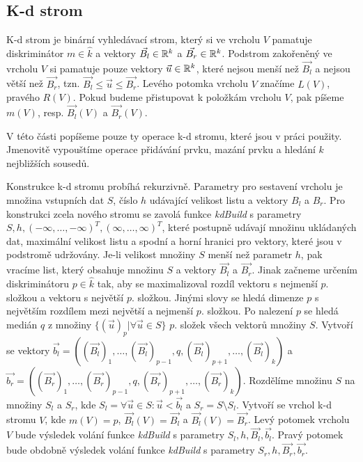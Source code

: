 \subsection{K-d strom}

K-d strom je binární vyhledávací strom, který si ve vrcholu $V$ pamatuje diskriminátor $m \in \hat k$ a vektory $\vec{B_l} \in \mathbb{R}^k$ a $\vec{B_r} \in \mathbb{R}^k$. Podstrom zakořeněný ve vrcholu $V$ si pamatuje pouze vektory $\vec{u} \in \mathbb{R}^k$, které nejsou menší než $\vec{B_l}$ a nejsou větší než $\vec{B_r}$, tzn. $\vec{B_l} \leq \vec{u} \leq \vec{B_r}$. Levého potomka vrcholu $V$ značíme $L(V)$, pravého $R(V)$. Pokud budeme přistupovat k položkám vrcholu $V$, pak píšeme $m(V)$, resp. $\vec{B_l}(V)$ a $\vec{B_r}(V)$.

V této části popíšeme pouze ty operace k-d stromu, které jsou v práci použity. Jmenovitě vypouštíme operace přidávání prvku, mazání prvku a hledání $k$ nejbližších sousedů.

Konstrukce k-d stromu probíhá rekurzivně. Parametry pro sestavení vrcholu je množina vstupních dat $S$, číslo $h$ udávající velikost listu a vektory $B_l$ a $B_r$. Pro konstrukci zcela nového stromu se zavolá funkce \textit{kdBuild} s parametry $S, h, (-\infty, \ldots, -\infty)^T, (\infty, \ldots, \infty)^T$, které postupně udávají množinu ukládaných dat, maximální velikost listu a spodní a horní hranici pro vektory, které jsou v podstromě udržovány. Je-li velikost množiny $S$ menší než parametr $h$, pak vracíme list, který obsahuje množinu $S$ a vektory $\vec{B_l}$ a $\vec{B_r}$. Jinak začneme určením diskriminátoru $p \in \hat k$ tak, aby se maximalizoval rozdíl vektoru s nejmenší $p.$ složkou a vektoru s největší $p.$ složkou. Jinými slovy se hledá dimenze $p$ s největším rozdílem mezi největší a nejmenší $p.$ složkou. Po nalezení $p$ se hledá medián $q$ z množiny $\{(\vec{u})_p | \forall \vec{u} \in S\}$ $p.$ složek všech vektorů množiny $S$. Vytvoří se vektory $\vec{b_l} = ((\vec{B_l})_1, \ldots, (\vec{B_l})_{p-1}, q, (\vec{B_l})_{p+1}, \ldots, (\vec{B_l})_k)$ a $\vec{b_r} = ((\vec{B_r})_1, \ldots, (\vec{B_r})_{p-1}, q, (\vec{B_r})_{p+1}, \ldots, (\vec{B_r})_k)$. Rozdělíme množinu $S$ na množiny $S_l$ a $S_r$, kde $S_l = {\forall\vec{u} \in S: \vec{u} < \vec{b_l}}$ a $S_r = S \setminus S_l$. Vytvoří se vrchol k-d stromu $V$, kde $m(V) = p$, $\vec{B_l}(V) = \vec{B_l}$ a $\vec{B_l}(V) = \vec{B_r}$. Levý potomek vrcholu $V$ bude výsledek volání funkce \textit{kdBuild} s parametry $S_l, h, \vec{B_l}, \vec{b_l}$. Pravý potomek bude obdobně výsledek volání funkce \textit{kdBuild} s parametry $S_r, h, \vec{B_r}, \vec{b_r}$.

